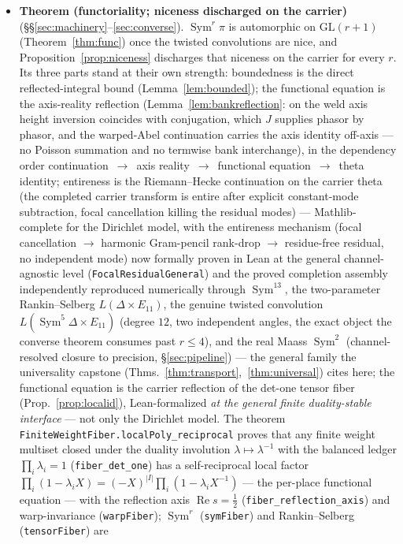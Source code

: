 \documentclass[11pt]{article}
\theoremstyle{definition}
\renewcommand{\Re}{\operatorname{Re}}
\newcommand{\Sym}{\operatorname{Sym}}
\begin{document}
\begin{itemize}
\item \textbf{Theorem (functoriality; niceness discharged on the carrier)}
(\S\S\ref{sec:machinery}--\ref{sec:converse}). $\Sym^r\pi$ is automorphic on $\mathrm{GL}(r+1)$
(Theorem~\ref{thm:func}) once the twisted convolutions are nice, and Proposition~\ref{prop:niceness}
discharges that niceness on the carrier for every $r$. Its three parts stand at their own strength:
boundedness is the direct reflected-integral bound (Lemma~\ref{lem:bounded}); the functional equation is the
axis-reality reflection (Lemma~\ref{lem:bankreflection}: on the weld axis height inversion coincides with
conjugation, which $J$ supplies phasor by phasor, and the warped-Abel continuation carries the axis identity
off-axis --- no Poisson summation and no termwise bank interchange), in the dependency order
continuation~$\to$~axis reality~$\to$~functional equation~$\to$~theta identity; entireness is the Riemann--Hecke
continuation on the carrier theta (the completed carrier transform is entire after explicit constant-mode
subtraction, focal cancellation killing the residual modes) --- Mathlib-complete for the Dirichlet model,
with the entireness mechanism (focal cancellation $\to$ harmonic Gram-pencil rank-drop $\to$ residue-free
residual, no independent mode) now formally proven in Lean at the general channel-agnostic level
(\texttt{FocalResidualGeneral}) and the proved completion assembly independently reproduced numerically through $\Sym^{13}$, the
two-parameter Rankin--Selberg $L(\Delta\times E_{11})$, the genuine twisted convolution $L(\Sym^5\Delta\times E_{11})$ (degree $12$, two independent angles, the exact object the converse theorem consumes past $r\le4$), and the real Maass $\Sym^2$ (channel-resolved closure to
precision, \S\ref{sec:pipeline}) --- the general family the universality capstone
(Thms.~\ref{thm:transport},~\ref{thm:universal}) cites here; the
functional equation is the carrier reflection of the det-one tensor fiber (Prop.~\ref{prop:localid}),
Lean-formalized \emph{at the general finite duality-stable interface} --- not only the Dirichlet model.
The theorem \texttt{FiniteWeightFiber.localPoly\_reciprocal} proves that any finite weight multiset
closed under the duality involution $\lambda\mapsto\lambda^{-1}$ with the balanced ledger
$\prod_i\lambda_i=1$ (\texttt{fiber\_det\_one}) has a self-reciprocal local factor
$\prod_i(1-\lambda_i X)=(-X)^{|I|}\prod_i(1-\lambda_i X^{-1})$ --- the per-place functional equation ---
with the reflection axis $\Re s=\tfrac12$ (\texttt{fiber\_reflection\_axis}) and warp-invariance
(\texttt{warpFiber}); $\Sym^r$ (\texttt{symFiber}) and Rankin--Selberg (\texttt{tensorFiber}) are

\end{itemize}
\end{document}
